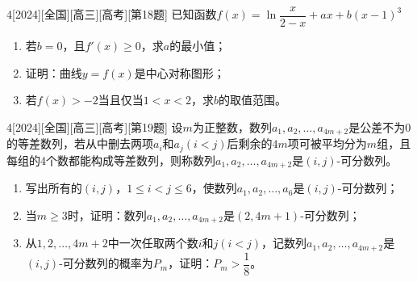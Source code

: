 \begin{example}{4}[2024][全国][高三][高考][第18题]
已知函数$f(x)=\ln\dfrac{x}{2-x}+ax+b(x-1)^3$
\begin{enumerate}
\item 若$b=0$，且$f'(x)\ge 0$，求$a$的最小值；
\item 证明：曲线$y=f(x)$是中心对称图形；
\item 若$f(x)>-2$当且仅当$1<x<2$，求$b$的取值范围。
\end{enumerate}
\end{example}

\begin{example}{4}[2024][全国][高三][高考][第19题]
设$m$为正整数，数列$a_1,a_2,\dots,a_{4m+2}$是公差不为$0$的等差数列，若从中删去两项$a_i$和$a_j(i<j)$后剩余的$4m$项可被平均分为$m$组，且每组的$4$个数都能构成等差数列，则称数列$a_1,a_2,\dots,a_{4m+2}$是$(i,j)$-可分数列。
\begin{enumerate}
\item 写出所有的$(i,j)$，$1\le i<j\le 6$，使数列$a_1,a_2,\dots,a_6$是$(i,j)$-可分数列；
\item 当$m\ge 3$时，证明：数列$a_1,a_2,\dots,a_{4m+2}$是$(2,4m+1)$-可分数列；
\item 从$1,2,\dots,4m+2$中一次任取两个数$i$和$j(i<j)$，记数列$a_1,a_2,\dots,a_{4m+2}$是$(i,j)$-可分数列的概率为$P_m$，证明：$P_m>\dfrac{1}{8}$。
\end{enumerate}
\end{example}